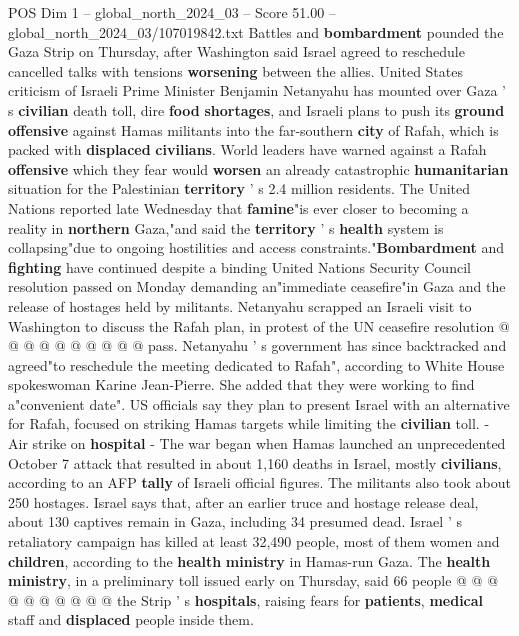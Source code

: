 \begin{textsample}{POS Dim 1 – global\_north\_2024\_03 – Score 51.00 – global\_north\_2024\_03/107019842.txt}  \label{ex:f1_pos_052}
Battles and \textbf{bombardment} pounded the Gaza Strip on Thursday, after Washington said Israel agreed to reschedule cancelled talks with tensions \textbf{worsening} between the allies.
United States criticism of Israeli Prime Minister Benjamin Netanyahu has mounted over Gaza ' s \textbf{civilian} death toll, dire \textbf{food} \textbf{shortages}, and Israeli plans to push its \textbf{ground} \textbf{offensive} against Hamas militants into the far-southern \textbf{city} of Rafah, which is packed with \textbf{displaced} \textbf{civilians}.
World leaders have warned against a Rafah \textbf{offensive} which they fear would \textbf{worsen} an already catastrophic \textbf{humanitarian} situation for the Palestinian \textbf{territory} ' s 2.4 million residents.
The United Nations reported late Wednesday that \textbf{famine}"is ever closer to becoming a reality in \textbf{northern} Gaza,"and said the \textbf{territory} ' s \textbf{health} system is collapsing"due to ongoing hostilities and access constraints."\textbf{Bombardment} and \textbf{fighting} have continued despite a binding United Nations Security Council resolution passed on Monday demanding an"immediate ceasefire"in Gaza and the release of hostages held by militants.
Netanyahu scrapped an Israeli visit to Washington to discuss the Rafah plan, in protest of the UN ceasefire resolution @ @ @ @ @ @ @ @ @ @ pass.
Netanyahu ' s government has since backtracked and agreed"to reschedule the meeting dedicated to Rafah", according to White House spokeswoman Karine Jean-Pierre.
She added that they were working to find a"convenient date".
US officials say they plan to present Israel with an alternative for Rafah, focused on striking Hamas targets while limiting the \textbf{civilian} toll. - Air strike on \textbf{hospital} - The war began when Hamas launched an unprecedented October 7 attack that resulted in about 1,160 deaths in Israel, mostly \textbf{civilians}, according to an AFP \textbf{tally} of Israeli official figures.
The militants also took about 250 hostages.
Israel says that, after an earlier truce and hostage release deal, about 130 captives remain in Gaza, including 34 presumed dead.
Israel ' s retaliatory campaign has killed at least 32,490 people, most of them women and \textbf{children}, according to the \textbf{health} \textbf{ministry} in Hamas-run Gaza.
The \textbf{health} \textbf{ministry}, in a preliminary toll issued early on Thursday, said 66 people @ @ @ @ @ @ @ @ @ @ the Strip ' s \textbf{hospitals}, raising fears for \textbf{patients}, \textbf{medical} staff and \textbf{displaced} people inside them.

\end{textsample}
